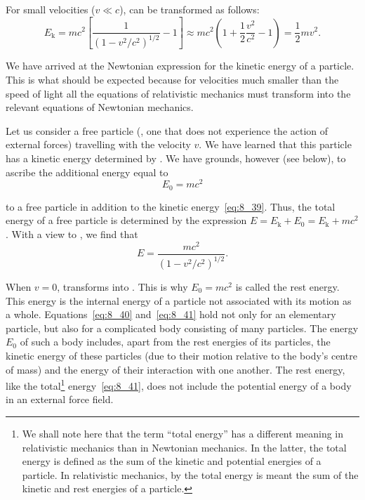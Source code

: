 For small velocities ($v\ll c$),  can be transformed as follows:
\begin{equation*}
	E_{\text{k}} = mc^2 \left[\frac{1}{\left(1-v^2/c^2\right)^{1/2}} - 1\right]\approx mc^2\left(1 + \frac{1}{2}\frac{v^2}{c^2} - 1\right) = \frac{1}{2}mv^2.
\end{equation*}

\noindent
We have arrived at the Newtonian expression for the kinetic energy of a particle. This is what should be expected because for velocities much smaller than the speed of light all the equations of relativistic mechanics must transform into the relevant equations of Newtonian mechanics.

Let us consider a free particle (\ie, one that does not experience the action of external forces) travelling with the velocity $v$. We have learned that this particle has a kinetic energy determined by . We have grounds, however (see below), to ascribe the additional energy equal to
\begin{equation}\label{eq:8_40}
	E_0 = mc^2
\end{equation}

\noindent
to a free particle in addition to the kinetic energy~\eqref{eq:8_39}. Thus, the total energy of a free particle is determined by the expression $E=E_{\text{k}}+E_0=E_{\text{k}}+mc^2$. With a view to , we find that
\begin{equation}\label{eq:8_41}
	E = \frac{mc^2}{\left(1-v^2/c^2\right)^{1/2}}.
\end{equation}

When $v=0$,  transforms into . This is why $E_0=mc^2$ is called the rest energy. This energy is the internal energy of a particle not associated with its motion as a whole. Equations~\eqref{eq:8_40} and~\eqref{eq:8_41} hold not only for an elementary particle, but also for a complicated body consisting of many particles. The energy $E_0$ of such a body includes, apart from the rest energies of its particles, the kinetic energy of these particles (due to their motion relative to the body's centre of mass) and the energy of their interaction with one another. The rest energy, like the total\footnote{We shall note here that the term ``total energy'' has a different meaning in relativistic mechanics than in Newtonian mechanics. In the latter, the total energy is defined as the sum of the kinetic and potential energies of a particle. In relativistic mechanics, by the total energy is meant the sum of the kinetic and rest energies of a particle.} energy~\eqref{eq:8_41}, does not include the potential energy of a body in an external force field.


